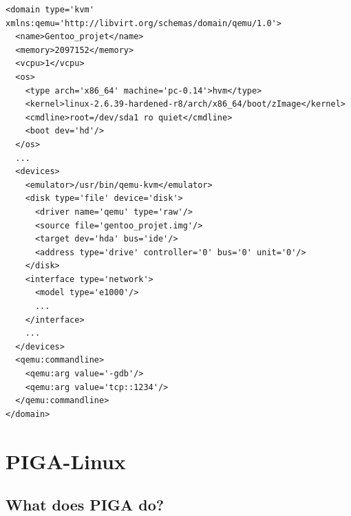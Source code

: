 \documentclass[pdftex,a4paper,titlepage,11pt]{article}
\begin{document}
\begin{lstlisting}
<domain type='kvm' xmlns:qemu='http://libvirt.org/schemas/domain/qemu/1.0'>
  <name>Gentoo_projet</name>
  <memory>2097152</memory>
  <vcpu>1</vcpu>
  <os>
    <type arch='x86_64' machine='pc-0.14'>hvm</type>
    <kernel>linux-2.6.39-hardened-r8/arch/x86_64/boot/zImage</kernel>
    <cmdline>root=/dev/sda1 ro quiet</cmdline>
    <boot dev='hd'/>
  </os>
  ...
  <devices>
    <emulator>/usr/bin/qemu-kvm</emulator>
    <disk type='file' device='disk'>
      <driver name='qemu' type='raw'/>
      <source file='gentoo_projet.img'/>
      <target dev='hda' bus='ide'/>
      <address type='drive' controller='0' bus='0' unit='0'/>
    </disk>
    <interface type='network'>
      <model type='e1000'/>
      ...
    </interface>
    ...
  </devices>
  <qemu:commandline>
    <qemu:arg value='-gdb'/>
    <qemu:arg value='tcp::1234'/>
  </qemu:commandline>
</domain>
\end{lstlisting}





\newpage

\section{PIGA-Linux}

\subsection{What does PIGA do?}
\end{document}
